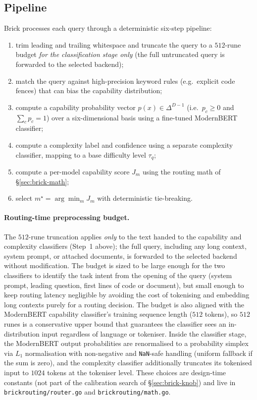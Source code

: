 \documentclass[twocolumn,10pt,a4paper]{article}
\begin{document}
\subsection{Pipeline}\label{sec:brick-pipeline}
\begin{samepage}
Brick processes each query through a deterministic six-step pipeline:
\nopagebreak
\begin{enumerate}\setlength{\itemsep}{3pt}\setlength{\parskip}{0pt}
  \item trim leading and trailing whitespace and truncate the query to a $512$-rune budget \emph{for the classification stage only} (the full untruncated query is forwarded to the selected backend);
  \item match the query against high-precision keyword rules (e.g.\ explicit code fences) that can bias the capability distribution;
  \item compute a capability probability vector $p(x)\in\Delta^{D-1}$ (i.e.\ $p_c\!\ge\!0$ and $\sum_c p_c{=}1$) over a six-dimensional basis using a fine-tuned ModernBERT classifier;
  \item compute a complexity label and confidence using a separate complexity classifier, mapping to a base difficulty level $\tau_q$;
  \item compute a per-model capability score $J_m$ using the routing math of §\ref{sec:brick-math};
  \item select $m^{\star}=\arg\min_m J_m$ with deterministic tie-breaking.
\end{enumerate}
\end{samepage}

\paragraph{Routing-time preprocessing budget.} The $512$-rune truncation applies \emph{only} to the text handed to the capability and complexity classifiers (Step~1 above); the full query, including any long context, system prompt, or attached documents, is forwarded to the selected backend without modification. The budget is sized to be large enough for the two classifiers to identify the task intent from the opening of the query (system prompt, leading question, first lines of code or document), but small enough to keep routing latency negligible by avoiding the cost of tokenising and embedding long contexts purely for a routing decision. The budget is also aligned with the ModernBERT capability classifier's training sequence length ($512$ tokens), so $512$ runes is a conservative upper bound that guarantees the classifier sees an in-distribution input regardless of language or tokeniser. Inside the classifier stage, the ModernBERT output probabilities are renormalised to a probability simplex via $L_1$ normalisation with non-negative and \texttt{NaN}-safe handling (uniform fallback if the sum is zero), and the complexity classifier additionally truncates its tokenised input to $1024$ tokens at the tokeniser level. These choices are design-time constants (not part of the calibration search of §\ref{sec:brick-knob}) and live in \texttt{brickrouting/router.go} and \texttt{brickrouting/math.go}.
\end{document}
